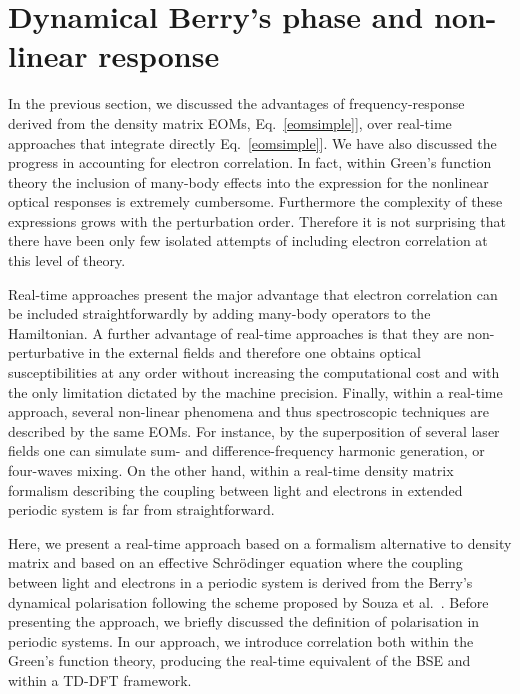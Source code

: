 \section{Dynamical Berry's phase and non-linear response} 
\label{chapterberry}
In the previous section, we discussed the advantages of frequency-response derived from the  density matrix EOMs, Eq.~\ref{eomsimple}], over real-time approaches that integrate directly Eq.~\ref{eomsimple}].
    We have also discussed the progress in accounting for electron correlation. In fact, within Green's function theory the inclusion of many-body effects into the expression for the nonlinear optical responses is extremely cumbersome. Furthermore the complexity of these expressions grows with the perturbation order. Therefore it is not surprising that there have been only few isolated attempts of including electron correlation at this level of theory.

    Real-time approaches present the major advantage that electron correlation can be included straightforwardly by adding many-body operators to the Hamiltonian. A further advantage of real-time approaches is that they are non-perturbative in the external fields and therefore one obtains optical susceptibilities at any order without increasing the computational cost and with the only limitation dictated by the machine precision. Finally, within a real-time approach, several non-linear phenomena and thus spectroscopic techniques are described by the same EOMs. For instance, by the superposition of several laser fields one can simulate sum- and difference-frequency harmonic generation, or four-waves mixing.\cite{boyd} On the other hand, within a real-time density matrix formalism describing the coupling between light and electrons in extended  periodic system is far from straightforward.

    Here, we present a real-time \ai approach based on a formalism alternative to density matrix and based on an effective Schr\"odinger equation where the coupling between light and electrons in a periodic system is derived from the Berry's dynamical polarisation following the scheme proposed by Souza et al.~\cite{souza_prb}. Before presenting the approach, we briefly discussed the  definition of polarisation in periodic systems. In our approach, we introduce correlation both within the Green's function theory, producing the real-time equivalent of the BSE and within a TD-DFT framework.  
    
